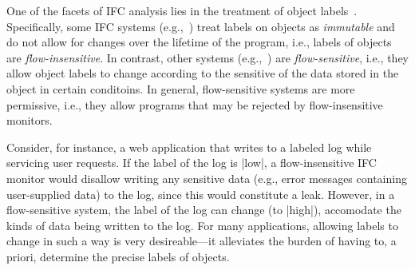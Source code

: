 One of the facets of IFC analysis lies in the treatment of
object labels~\cite{Hunt:2006}.
%
Specifically, some IFC systems (e.g.,~\cite{Breeze, Aeolus, stefan:lio,
stefan:addressing-covert, zeldovich:histar, Efstathopoulos:2005, krohn:flume})
treat labels on objects as \emph{immutable} and do not allow for changes over
the lifetime of the program, i.e., labels of objects are \emph{flow-insensitive}.
%
In contrast, other systems (e.g.,~\cite{jif, FlowCaml,
Zdancewic02programminglanguages, Austin:Flanagan:PLAS09,
Austin:Flanagan:PLAS10}) are \emph{flow-sensitive}, i.e., they allow object
labels to change according to the sensitive of the data stored in the object in
certain conditoins.
%
In general, flow-sensitive systems are more permissive, i.e., they allow
programs that may be rejected by flow-insensitive monitors.
 
Consider, for instance, a web application that writes to a labeled
log while servicing user requests.
%
If the label of the log is |low|, a flow-insensitive IFC monitor would disallow
writing any sensitive data (e.g., error messages containing user-supplied data)
to the log, since this would constitute a leak.
%
However, in a flow-sensitive system, the label of the log can change (to
|high|), accomodate the kinds of data being written to the log.
%
For many applications, allowing labels to change in such a way is very
desireable---it alleviates the burden of having to, a priori, determine the
precise labels of objects.

